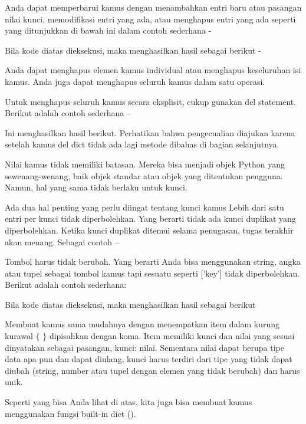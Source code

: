 Anda dapat memperbarui kamus dengan menambahkan entri baru atau pasangan nilai kunci, memodifikasi entri yang ada, atau menghapus entri yang ada seperti yang ditunjukkan di bawah ini dalam contoh sederhana - \par

Bila kode diatas dieksekusi, maka menghasilkan hasil sebagai berikut - \par

Anda dapat menghapus elemen kamus individual atau menghapus keseluruhan isi kamus. Anda juga dapat menghapus seluruh kamus dalam satu operasi.

Untuk menghapus seluruh kamus secara eksplisit, cukup gunakan del statement. Berikut adalah contoh sederhana – \par

Ini menghasilkan hasil berikut. Perhatikan bahwa pengecualian diajukan karena setelah kamus del dict tidak ada lagi metode dibahas di bagian selanjutnya. \par

Nilai kamus tidak memiliki batasan. Mereka bisa menjadi objek Python yang sewenang-wenang, baik objek standar atau objek yang ditentukan pengguna. Namun, hal yang sama tidak berlaku untuk kunci. \par
 
Ada dua hal penting yang perlu diingat tentang kunci kamus 
Lebih dari satu entri per kunci tidak diperbolehkan. Yang berarti tidak ada kunci duplikat yang diperbolehkan. Ketika kunci duplikat ditemui selama penugasan, tugas terakhir akan menang. Sebagai contoh – \par
Tombol harus tidak berubah. Yang berarti Anda bisa menggunakan string, angka atau tupel sebagai tombol kamus tapi sesuatu seperti ['key'] tidak diperbolehkan. Berikut adalah contoh sederhana: \par

Bila kode diatas dieksekusi, maka menghasilkan hasil sebagai berikut 

Membuat kamus sama mudahnya dengan menempatkan item dalam kurung kurawal  $  \{  $ $  \}  $ dipisahkan dengan koma. Item memiliki kunci dan nilai yang sesuai dinyatakan sebagai pasangan, kunci: nilai. Sementara nilai dapat berupa tipe data apa pun dan dapat diulang, kunci harus terdiri dari tipe yang tidak dapat diubah (string, number atau tupel dengan elemen yang tidak berubah) dan harus unik. \par

Seperti yang bisa Anda lihat di atas, kita juga bisa membuat kamus menggunakan fungsi built-in dict (). 

